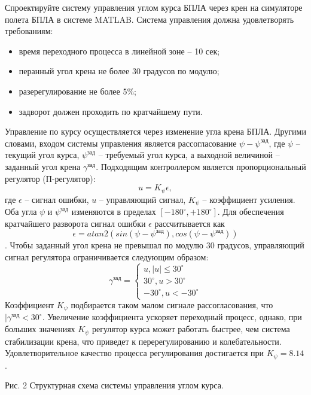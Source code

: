 
Спроектируйте систему управления углом курса БПЛА через крен на симуляторе полета БПЛА в системе MATLAB. Система управления должна удовлетворять требованиям:
\begin{itemize}
	\item время переходного процесса в линейной зоне – 10 сек;
	\item перанный угол крена не более 30 градусов по модулю;
	\item разерегулирование не более 5\%;
	\item задворот должен проходить по кратчайшему пути.
\end{itemize}
\solutionSection
Управление по курсу осуществляется через изменение угла крена БПЛА. Другими словами, входом системы управления является рассогласование $\psi-\psi^\text{зад}$, где $\psi$ – текущий угол курса, $\psi^\text{зад}$ – требуемый угол курса, а выходной величиной – заданный угол крена $γ^\text{зад}$. 
Подходящим контроллером является пропорциональный регулятор (П-регулятор):
$$u=K_\psi \epsilon,$$
где $\epsilon$ – сигнал ошибки, $u$ – управляющий сигнал, $K_\psi$ – коэффициент усиления.
Оба угла $\psi$ и $\psi^\text{зад}$ изменяются в пределах $[-180^\circ, +180^\circ]$. Для обеспечения кратчайшего разворота сигнал ошибки $\epsilon$ рассчитывается как
$$\epsilon=atan2(sin⁡(\psi-\psi^\text{зад} ),cos⁡(\psi-\psi^\text{зад} ) )$$.
Чтобы заданный угол крена не превышал по модулю 30 градусов, управляющий сигнал регулятора ограничивается следующим образом:
\begin{displaymath}
    \gamma^\text{зад}= \left\{ \begin{array}{ll}
     u , |u| \leq 30^\circ\\
    30^\circ, u > 30^\circ \\
    -30^\circ,u < -30^\circ
    \end{array} \right.
\end{displaymath}
Коэффициент $K_\psi$ подбирается таком малом сигнале рассогласования, что $|\gamma^\text{зад} <30^\circ$. Увеличение коэффициента ускоряет переходный процесс, однако, при больших значениях $K_\psi$ регулятор курса может работать быстрее, чем система стабилизации крена, что приведет к перерегулированию и колебательности. Удовлетворительное качество процесса регулирования достигается при $K_\psi=8.14$.
\begin{center}
    Рис. 2 Структурная схема системы управления углом курса.
  \end{center} 
